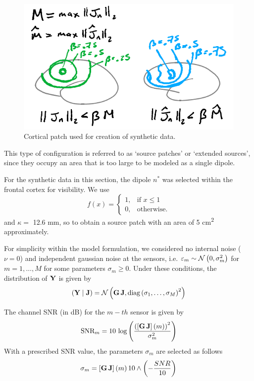 \begin{figure}
\centering
\includegraphics[width=0.8\linewidth]{./img_dev/nsCurves1}
\caption{Cortical patch used for creation of synthetic data.}
\label{fig:exaple_true}
\end{figure}

This type of configuration is referred to as `source patches' or `extended sources', since they occupy an area that is too large to be modeled as a single dipole.

For the synthetic data in this section, the dipole $n^*$ was selected within the frontal cortex for visibility.
%
We use 
\begin{equation}
f(x) = \begin{cases}
1, &\text{if } x\leq 1 \\
0, &\text{otherwise}.
\end{cases}
\end{equation}
and $\kappa = $ 12.6 \si{mm}, so to obtain a source patch with an area of 5 \si{cm^2} approximately.

For simplicity within the model formulation, we considered no internal noise ($\nu=0$) and independent gaussian noise at the sensors, i.e. $\varepsilon_m \sim\mathcal{N}\left( 0, \sigma_m^2 \right)$ for $m = 1, \dots, M$ for some parameters $\sigma_m\geq 0$.
%
Under these conditions, the distribution of $\mathbf{Y}$ is given by
\begin{equation}
\left( \mathbf{Y} \;\middle|\; \mathbf{J} \right) =
\mathcal{N}\left(  \mathbf{G}\, \mathbf{J}, \text{diag}\left(  \sigma_1, \dots, \sigma_M  \right)^2  \right)
\end{equation}

The channel SNR (in dB) for the $m-th$ sensor is given by
\begin{equation}
\text{SNR}_m = 
10\, \log\left(  \frac{ \left(  \left[ \mathbf{G}\, \mathbf{J} \right](m) \right)^2 }{\sigma_m^2}  \right)
\end{equation}
With a prescribed SNR value, the parameters $\sigma_m$ are selected as follows
\begin{equation}
\sigma_m = 
\left[ \mathbf{G}\, \mathbf{J} \right](m)\,
10\wedge \left( -\frac{SNR}{10} \right)
\end{equation}

